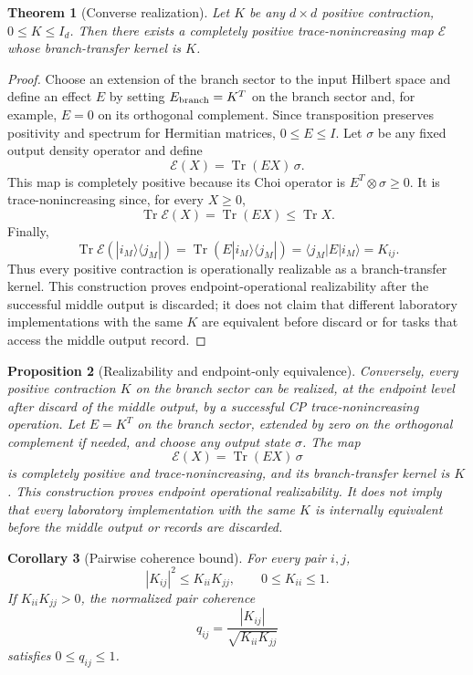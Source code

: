 \documentclass[reprint,aps,pra,superscriptaddress,nofootinbib,longbibliography]{revtex4-2}
\newtheorem{theorem}{Theorem}
\newtheorem{proposition}[theorem]{Proposition}
\newtheorem{corollary}[theorem]{Corollary}
\newcommand{\ket}[1]{|#1\rangle}
\newcommand{\bra}[1]{\langle #1|}
\newcommand{\Tr}{\operatorname{Tr}}
\newcommand{\EE}{\mathcal E}
\begin{document}
\begin{theorem}[Converse realization]
Let \(K\) be any \(d\times d\) positive contraction, \(0\le K\le I_d\).  Then there exists a completely positive trace-nonincreasing map \(\EE\) whose branch-transfer kernel is \(K\).
\end{theorem}

\begin{proof}
Choose an extension of the branch sector to the input Hilbert space and define an effect \(E\) by setting \(E_{\rm branch}=K^T\) on the branch sector and, for example, \(E=0\) on its orthogonal complement.  Since transposition preserves positivity and spectrum for Hermitian matrices, \(0\le E\le I\).  Let \(\sigma\) be any fixed output density operator and define
\[
\EE(X)=\Tr(EX)\,\sigma .
\]
This map is completely positive because its Choi operator is \(E^T\otimes\sigma\ge0\).  It is trace-nonincreasing since, for every \(X\ge0\),
\[
\Tr\EE(X)=\Tr(EX)\le \Tr X .
\]
Finally,
\[
\Tr\EE(\ket{i_M}\bra{j_M})
=\Tr(E\ket{i_M}\bra{j_M})
=\bra{j_M}E\ket{i_M}
=K_{ij}.
\]
Thus every positive contraction is operationally realizable as a branch-transfer kernel.
This construction proves endpoint-operational realizability after the successful middle output is discarded; it does not claim that different laboratory implementations with the same \(K\) are equivalent before discard or for tasks that access the middle output record.
\end{proof}

\begin{proposition}[Realizability and endpoint-only equivalence]
Conversely, every positive contraction \(K\) on the branch sector can be realized, at the endpoint level after discard of the middle output, by a successful CP trace-nonincreasing operation.  Let \(E=K^T\) on the branch sector, extended by zero on the orthogonal complement if needed, and choose any output state \(\sigma\).  The map
\[
\mathcal E(X)=\Tr(EX)\,\sigma
\]
is completely positive and trace-nonincreasing, and its branch-transfer kernel is \(K\).  This construction proves endpoint operational realizability.  It does not imply that every laboratory implementation with the same \(K\) is internally equivalent before the middle output or records are discarded.
\end{proposition}

\begin{corollary}[Pairwise coherence bound]
For every pair \(i,j\),
\begin{equation}
|K_{ij}|^2\le K_{ii}K_{jj},
\qquad
0\le K_{ii}\le1.
\label{eq:pair-bound}
\end{equation}
If \(K_{ii}K_{jj}>0\), the normalized pair coherence
\begin{equation}
q_{ij}
=
\frac{|K_{ij}|}{\sqrt{K_{ii}K_{jj}}}
\label{eq:qij}
\end{equation}
satisfies \(0\le q_{ij}\le1\).
\end{corollary}
\end{document}

